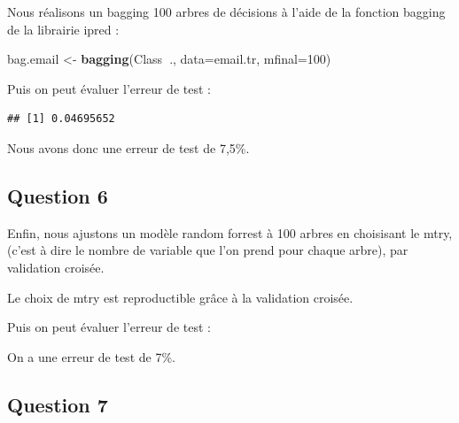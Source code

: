 \documentclass[
]{article}
\newenvironment{Shaded}{\begin{snugshade}}{\end{snugshade}}
\newcommand{\DataTypeTok}[1]{\textcolor[rgb]{0.13,0.29,0.53}{#1}}
\newcommand{\DecValTok}[1]{\textcolor[rgb]{0.00,0.00,0.81}{#1}}
\newcommand{\KeywordTok}[1]{\textcolor[rgb]{0.13,0.29,0.53}{\textbf{#1}}}
\newcommand{\NormalTok}[1]{#1}
\newcommand{\OperatorTok}[1]{\textcolor[rgb]{0.81,0.36,0.00}{\textbf{#1}}}
\newcommand{\StringTok}[1]{\textcolor[rgb]{0.31,0.60,0.02}{#1}}
\begin{document}
Nous réalisons un bagging 100 arbres de décisions à l'aide de la
fonction bagging de la librairie ipred :

\begin{Shaded}
\begin{Highlighting}[]
\NormalTok{bag.email <-}\StringTok{ }\KeywordTok{bagging}\NormalTok{(Class}\OperatorTok{~}\NormalTok{., }\DataTypeTok{data=}\NormalTok{email.tr, }\DataTypeTok{mfinal=}\DecValTok{100}\NormalTok{)}
\end{Highlighting}
\end{Shaded}

Puis on peut évaluer l'erreur de test :

\begin{Shaded}
\end{Shaded}

\begin{verbatim}
## [1] 0.04695652
\end{verbatim}

Nous avons donc une erreur de test de 7,5\%.

\hypertarget{question-6}{%
\subsection{Question 6}\label{question-6}}

Enfin, nous ajustons un modèle random forrest à 100 arbres en choisisant
le mtry, (c'est à dire le nombre de variable que l'on prend pour chaque
arbre), par validation croisée.

Le choix de mtry est reproductible grâce à la validation croisée.

Puis on peut évaluer l'erreur de test :

On a une erreur de test de 7\%.

\hypertarget{question-7}{%
\subsection{Question 7}\label{question-7}}
\end{document}
